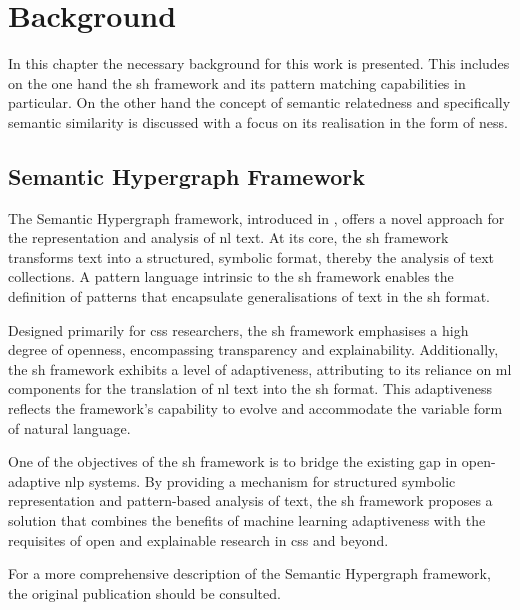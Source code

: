 \documentclass[11pt]{scrreprt}
\let\citef\cite  %
\let\cite\parencite  %
\begin{document}
\chapter{Background}

\label{cha:background}
In this chapter the necessary background for this work is presented. This includes on the one hand the \gls{sh} framework and its pattern matching capabilities in particular. On the other hand the concept of semantic relatedness and specifically semantic similarity is discussed with a focus on its realisation in the form of \gls{ness}.

\section{Semantic Hypergraph Framework}
\label{sec:semantic-hypergraph-framework}

The Semantic Hypergraph framework, introduced in \citef{menezesSemanticHypergraphs2021}, offers a novel approach for the representation and analysis of \gls{nl} text. At its core, the \gls{sh} framework transforms text into a structured, symbolic format, thereby the analysis of text collections. A pattern language intrinsic to the \gls{sh} framework enables the definition of patterns that encapsulate generalisations of text in the \gls{sh} format.

Designed primarily for \gls{css} researchers, the \gls{sh} framework emphasises a high degree of openness, encompassing transparency and explainability. Additionally, the \gls{sh} framework exhibits a level of adaptiveness, attributing to its reliance on \gls{ml} components for the translation of \gls{nl} text into the \gls{sh} format. This adaptiveness reflects the framework's capability to evolve and accommodate the variable form of natural language.

One of the objectives of the \gls{sh} framework is to bridge the existing gap in open-adaptive \gls{nlp} systems. By providing a mechanism for structured symbolic representation and pattern-based analysis of text, the \gls{sh} framework proposes a solution that combines the benefits of machine learning adaptiveness with the requisites of open and explainable research in \gls{css} and beyond.

For a more comprehensive description of the Semantic Hypergraph framework, the original publication \cite{menezesSemanticHypergraphs2021} should be consulted.
\end{document}
